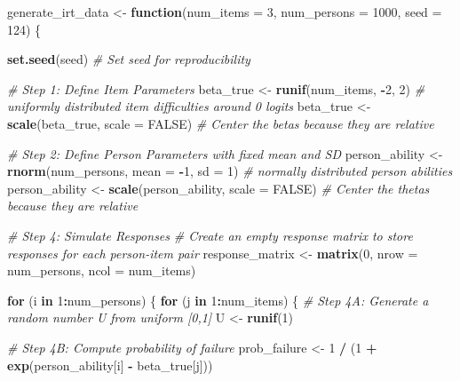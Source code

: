 \documentclass[
]{article}
\newenvironment{Shaded}{\begin{snugshade}}{\end{snugshade}}
\newcommand{\AttributeTok}[1]{\textcolor[rgb]{0.13,0.29,0.53}{#1}}
\newcommand{\CommentTok}[1]{\textcolor[rgb]{0.56,0.35,0.01}{\textit{#1}}}
\newcommand{\ConstantTok}[1]{\textcolor[rgb]{0.56,0.35,0.01}{#1}}
\newcommand{\ControlFlowTok}[1]{\textcolor[rgb]{0.13,0.29,0.53}{\textbf{#1}}}
\newcommand{\DecValTok}[1]{\textcolor[rgb]{0.00,0.00,0.81}{#1}}
\newcommand{\FunctionTok}[1]{\textcolor[rgb]{0.13,0.29,0.53}{\textbf{#1}}}
\newcommand{\NormalTok}[1]{#1}
\newcommand{\OtherTok}[1]{\textcolor[rgb]{0.56,0.35,0.01}{#1}}
\newcommand{\SpecialCharTok}[1]{\textcolor[rgb]{0.81,0.36,0.00}{\textbf{#1}}}
\begin{document}
\begin{Shaded}
\begin{Highlighting}[]
\NormalTok{generate\_irt\_data }\OtherTok{\textless{}{-}} \ControlFlowTok{function}\NormalTok{(}\AttributeTok{num\_items =} \DecValTok{3}\NormalTok{, }\AttributeTok{num\_persons =} \DecValTok{1000}\NormalTok{, }\AttributeTok{seed =} \DecValTok{124}\NormalTok{) \{}
  
  \FunctionTok{set.seed}\NormalTok{(seed) }\CommentTok{\# Set seed for reproducibility}
  
  \CommentTok{\# Step 1: Define Item Parameters}
\NormalTok{  beta\_true }\OtherTok{\textless{}{-}} \FunctionTok{runif}\NormalTok{(num\_items, }\SpecialCharTok{{-}}\DecValTok{2}\NormalTok{, }\DecValTok{2}\NormalTok{) }\CommentTok{\# uniformly distributed item difficulties around 0 logits}
\NormalTok{  beta\_true }\OtherTok{\textless{}{-}} \FunctionTok{scale}\NormalTok{(beta\_true, }\AttributeTok{scale =} \ConstantTok{FALSE}\NormalTok{) }\CommentTok{\# Center the betas because they are relative}
  
  \CommentTok{\# Step 2: Define Person Parameters with fixed mean and SD}
\NormalTok{  person\_ability }\OtherTok{\textless{}{-}} \FunctionTok{rnorm}\NormalTok{(num\_persons, }\AttributeTok{mean =} \SpecialCharTok{{-}}\DecValTok{1}\NormalTok{, }\AttributeTok{sd =} \DecValTok{1}\NormalTok{) }\CommentTok{\# normally distributed person abilities}
\NormalTok{  person\_ability }\OtherTok{\textless{}{-}} \FunctionTok{scale}\NormalTok{(person\_ability, }\AttributeTok{scale =} \ConstantTok{FALSE}\NormalTok{) }\CommentTok{\# Center the thetas because they are relative}
  
  \CommentTok{\# Step 4: Simulate Responses}
  \CommentTok{\# Create an empty response matrix to store responses for each person{-}item pair}
\NormalTok{  response\_matrix }\OtherTok{\textless{}{-}} \FunctionTok{matrix}\NormalTok{(}\DecValTok{0}\NormalTok{, }\AttributeTok{nrow =}\NormalTok{ num\_persons, }\AttributeTok{ncol =}\NormalTok{ num\_items)}
  
  \ControlFlowTok{for}\NormalTok{ (i }\ControlFlowTok{in} \DecValTok{1}\SpecialCharTok{:}\NormalTok{num\_persons) \{}
    \ControlFlowTok{for}\NormalTok{ (j }\ControlFlowTok{in} \DecValTok{1}\SpecialCharTok{:}\NormalTok{num\_items) \{}
      \CommentTok{\# Step 4A: Generate a random number U from uniform [0,1]}
\NormalTok{      U }\OtherTok{\textless{}{-}} \FunctionTok{runif}\NormalTok{(}\DecValTok{1}\NormalTok{)}
      
      \CommentTok{\# Step 4B: Compute probability of failure}
\NormalTok{      prob\_failure }\OtherTok{\textless{}{-}} \DecValTok{1} \SpecialCharTok{/}\NormalTok{ (}\DecValTok{1} \SpecialCharTok{+} \FunctionTok{exp}\NormalTok{(person\_ability[i] }\SpecialCharTok{{-}}\NormalTok{ beta\_true[j]))}
      

\end{Highlighting}
\end{Shaded}
\end{document}
